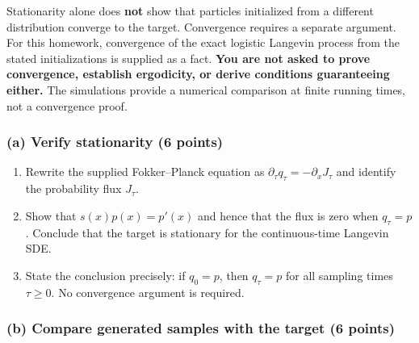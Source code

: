 \documentclass[11pt,a4paper]{article}
\providecommand{\tightlist}{\setlength{\itemsep}{0pt}\setlength{\parskip}{0pt}}
\begin{document}
Stationarity alone does \textbf{not} show that particles initialized
from a different distribution converge to the target. Convergence
requires a separate argument. For this homework, convergence of the
exact logistic Langevin process from the stated initializations is
supplied as a fact. \textbf{You are not asked to prove convergence,
establish ergodicity, or derive conditions guaranteeing either.} The
simulations provide a numerical comparison at finite running times, not
a convergence proof.

\subsubsection{(a) Verify stationarity (6
points)}\label{a-verify-stationarity-6-points}

\begin{enumerate}
\def\labelenumi{\arabic{enumi}.}
\tightlist
\item
  Rewrite the supplied Fokker--Planck equation as
  \(\partial_\tau q_\tau=-\partial_x J_\tau\) and identify the
  probability flux \(J_\tau\).
\item
  Show that \(s(x)p(x)=p'(x)\) and hence that the flux is zero when
  \(q_\tau=p\). Conclude that the target is stationary for the
  continuous-time Langevin SDE.
\item
  State the conclusion precisely: if \(q_0=p\), then \(q_\tau=p\) for
  all sampling times \(\tau\ge0\). No convergence argument is required.
\end{enumerate}

\subsubsection{(b) Compare generated samples with the target (6
points)}\label{b-compare-generated-samples-with-the-target-6-points}
\end{document}
